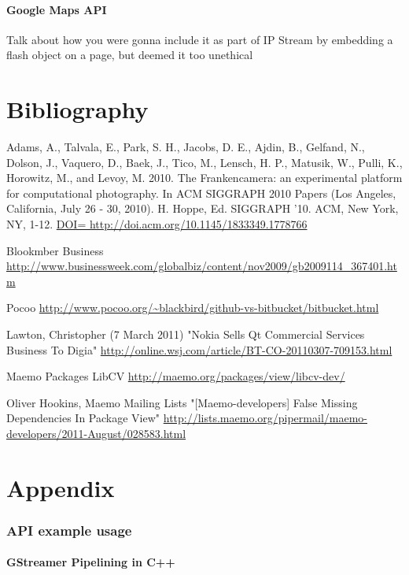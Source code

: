 \documentclass[11pt]{article} %
\begin{document}
\subsection{Google Maps API}{Talk about how you were gonna include it as part of IP Stream by embedding a flash object on a page, but deemed it too unethical}

\part{Bibliography}
\begin{thebibliography}{9}

 Adams, A., Talvala, E., Park, S. H., Jacobs, D. E., Ajdin, B., Gelfand, N., Dolson, J., Vaquero, D., Baek, J., Tico, M., Lensch, H. P., Matusik, W., Pulli, K., Horowitz, M., and Levoy, M.
2010. The Frankencamera: an experimental platform for computational photography.
In ACM SIGGRAPH 2010 Papers (Los Angeles, California, July 26 - 30, 2010).
H. Hoppe, Ed. SIGGRAPH '10. ACM, New York, NY, 1-12.
\url{DOI= http://doi.acm.org/10.1145/1833349.1778766}

 Blookmber Business
\url{http://www.businessweek.com/globalbiz/content/nov2009/gb2009114_367401.htm}

 Pocoo
\url{http://www.pocoo.org/~blackbird/github-vs-bitbucket/bitbucket.html}

 Lawton, Christopher (7 March 2011)
"Nokia Sells Qt Commercial Services Business To Digia"
\url{http://online.wsj.com/article/BT-CO-20110307-709153.html}

 Maemo Packages
LibCV
\url{http://maemo.org/packages/view/libcv-dev/}

 Oliver Hookins, Maemo Mailing Lists
"[Maemo-developers] False Missing Dependencies In Package View"
\url{http://lists.maemo.org/pipermail/maemo-developers/2011-August/028583.html}


\end{thebibliography}

\part{Appendix}
\section{API example usage}
\subsection{GStreamer Pipelining in C++}
\end{document}
